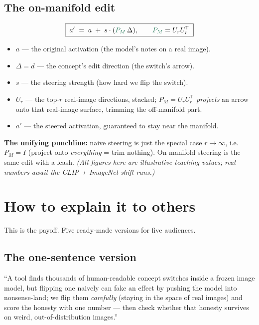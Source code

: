 \documentclass[12pt]{article}
\newcommand{\onm}[1]{\textcolor{onman}{#1}}
\begin{document}
\subsection*{The on-manifold edit}
\begin{equation*}
\boxed{\;a' \;=\; a \;+\; s\cdot(\onm{P_M}\,\Delta),\qquad \onm{P_M} = U_r U_r^{\!\top}\;}
\end{equation*}
\begin{itemize}[leftmargin=1.4em, itemsep=3pt]
  \item $a$ --- the original activation (the model's notes on a real image).
  \item $\Delta = d$ --- the concept's edit direction (the switch's arrow).
  \item $s$ --- the steering strength (how hard we flip the switch).
  \item $U_r$ --- the top-$r$ real-image directions, stacked; \onm{$P_M = U_r U_r^{\top}$} \emph{projects} an arrow onto that real-image surface, trimming the off-manifold part.
  \item $a'$ --- the steered activation, guaranteed to stay near the manifold.
\end{itemize}
\textbf{The unifying punchline:} naive steering is just the special case \onm{$r\to\infty$}, i.e.\ $P_M = I$ (project onto \emph{everything} = trim nothing). On-manifold steering is the same edit with a leash. \emph{(All figures here are illustrative teaching values; real numbers await the CLIP + ImageNet-shift runs.)}

\section{How to explain it to others}

This is the payoff. Five ready-made versions for five audiences.

\subsection*{The one-sentence version}
``A tool finds thousands of human-readable concept switches inside a frozen image model, but flipping one naively can fake an effect by pushing the model into nonsense-land; we flip them \emph{carefully} (staying in the space of real images) and score the honesty with one number --- then check whether that honesty survives on weird, out-of-distribution images.''
\end{document}
